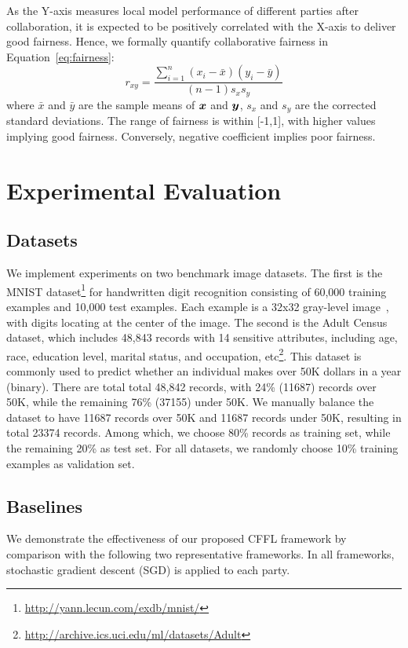 \documentclass{article}
\def\vec#1{\mathchoice{\mbox{\boldmath$\displaystyle#1$}}
  {\mbox{\boldmath$\textstyle#1$}}
  {\mbox{\boldmath$\scriptstyle#1$}}
  {\mbox{\boldmath$\scriptscriptstyle#1$}}}
\begin{document}
As the Y-axis measures local model performance of different parties after collaboration, it is expected to be positively correlated with the X-axis to deliver good fairness. Hence, we formally quantify collaborative fairness in Equation~\ref{eq:fairness}:
\begin{equation}\label{eq:fairness}
r_{xy}=\frac{{\textstyle\sum}_{i=1}^n (x_i-\bar{x})(y_i-\bar{y})}{(n-1)s_xs_y}
\end{equation}
where $\bar{x}$ and $\bar{y}$ are the sample means of $\vec{x}$ and $\vec{y}$, $s_x$ and $s_y$ are the corrected standard deviations. The range of fairness is within [-1,1], with higher values implying good fairness. Conversely, negative coefficient implies poor fairness. 


\section{Experimental Evaluation}
\label{sec:Performance}
\subsection{Datasets}
We implement experiments on two benchmark image datasets. The first is the MNIST dataset\footnote{\url{http://yann.lecun.com/exdb/mnist/}} for handwritten digit recognition consisting of 60,000 training examples and 10,000 test examples. Each example is a 32x32 gray-level image~\cite{shokri2015privacy}, with digits locating at the center of the image. The second is the Adult Census dataset, which includes 48,843 records with 14 sensitive attributes, including age, race, education level, marital status, and occupation, etc\footnote{\url{http://archive.ics.uci.edu/ml/datasets/Adult}}. This dataset is commonly used to predict whether an individual makes over 50K dollars in a year (binary). There are total total 48,842 records, with 24\% (11687) records over 50K, while the remaining 76\% (37155) under 50K. %
We manually balance the dataset to have 11687 records over 50K and 11687 records under 50K, resulting in total 23374 records. Among which, we choose 80\% records as training set, while the remaining 20\% as test set. 
For all datasets, we randomly choose 10\% training examples as validation set. 

\subsection{Baselines}
We demonstrate the effectiveness of our proposed CFFL framework by comparison with the following two representative frameworks. %
In all frameworks, stochastic gradient descent (SGD) is applied to each party.
\end{document}
